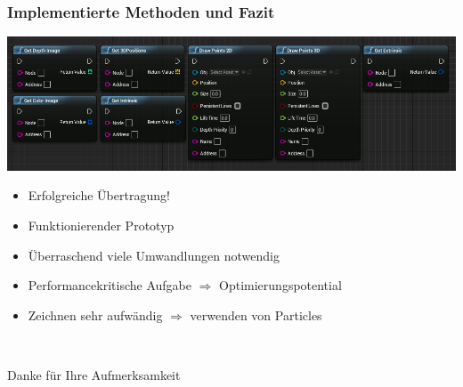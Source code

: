 \documentclass[18pt]{beamer}
\begin{document}
\begin{frame}
	\frametitle{Implementierte Methoden und Fazit} 
	\begin{center}
		\includegraphics[height=0.37\paperheight]{img/AllFunctionsBP}
	\end{center}
	\begin{itemize}
		\item Erfolgreiche Übertragung!
		\item Funktionierender Prototyp
		\item Überraschend viele Umwandlungen notwendig
		\item Performancekritische Aufgabe $\Rightarrow$ Optimierungspotential
		\item Zeichnen sehr aufwändig $\Rightarrow$ verwenden von Particles
	\end{itemize}
\end{frame}


\begin{frame}{~}
	\begin{center}
		\huge{Danke für Ihre Aufmerksamkeit}
	\end{center}
\end{frame}
\end{document}
